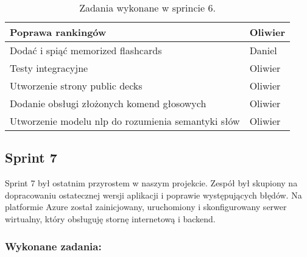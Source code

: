 \begin{table}[H]
\begin{tabularx}{\textwidth}{|p{}|X|}
    \hline
    [WEB] Poprawa rankingów & Oliwier \\
    \hline
    [MOBILE] Dodać i spiąć memorized flashcards & Daniel \\
    \hline
    [BACKEND] Testy integracyjne & Oliwier \\
    \hline
    [WEB] Utworzenie strony public decks & Oliwier \\
    \hline
    [WEB] Dodanie obsługi złożonych komend głosowych & Oliwier \\
    \hline
    [BACKEND] Utworzenie modelu nlp do rozumienia semantyki słów & Oliwier \\
    \hline
\end{tabularx}
                    \caption{Zadania wykonane w sprincie 6.}
\end{table}

\subsection{Sprint 7}

Sprint 7 był ostatnim przyrostem w naszym projekcie. Zespół był skupiony na dopracowaniu ostatecznej wersji aplikacji i poprawie występujących błędów. Na platformie Azure został zainicjowany, uruchomiony i skonfigurowany serwer wirtualny, który obsługuję stornę internetową i backend.

\subsubsection{Wykonane zadania:}

